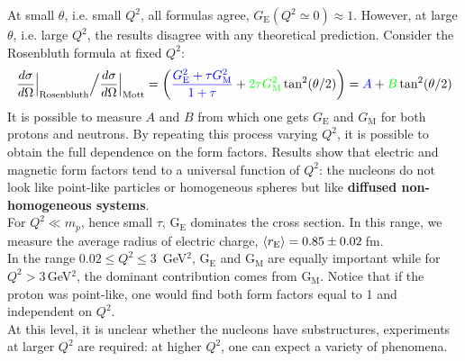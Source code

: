 \documentclass[10.75pt,a4paper,openright,bottom=2cm]{article}
\begin{document}
At small $\theta$, i.e. small $Q^2$, all formulas agree, $G_{\text{E}}(Q^2\simeq0)\approx1$. However, at large $\theta$, i.e. large $Q^2$, the results disagree with any theoretical prediction. Consider the Rosenbluth formula at fixed $Q^2$:
\[
\frac{d\sigma}{d\Omega}\Bigr|_{\substack{\text{Rosenbluth}}}\Bigr/\frac{d\sigma}{d\Omega}\Bigr|_{\substack{\text{Mott}}}=\left({\color{blue}\frac{G_{\text{E}}^2+\tau G_{\text{M}}^2}{1+\tau}}+{\color{green}2\tau G_{\text{M}}^2}\tan^2(\theta/2)\right)={\color{blue}A}+{\color{green}B}\tan^2(\theta/2)
\]
It is possible to measure $A$ and $B$ from which one gets $G_{\text{E}}$ and $G_{\text{M}}$ for both protons and neutrons. By repeating this process varying $Q^2$, it is possible to obtain the full dependence on the form factors. Results show that electric and magnetic form factors tend to a universal function of $Q^2$: the nucleons do not look like point-like particles or homogeneous spheres but like \textbf{diffused non-homogeneous systems}.\\
For $Q^2\ll m_p$, hence small $\tau$, G$_{\text{E}}$ dominates the cross section. In this range, we measure the average radius of electric charge, $\Braket{r_{\text{E}}}=0.85\pm0.02$\,fm.\\
In the range $0.02\le Q^2\le3$\, GeV$^2$, G$_{\text{E}}$ and G$_{\text{M}}$ are equally important while for $Q^2>3$\,GeV$^2$, the dominant contribution comes from G$_{\text{M}}$. Notice that if the proton was point-like, one would find both form factors equal to 1 and independent on $Q^2$.\\
At this level, it is unclear whether the nucleons have substructures, experiments at larger $Q^2$ are required: at higher $Q^2$, one can expect a variety of phenomena. 
\end{document}
